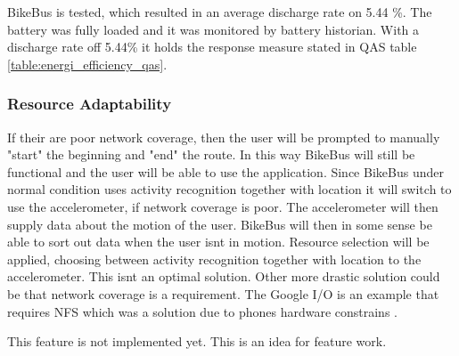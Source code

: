 BikeBus is tested, which resulted in an average discharge rate on 5.44 \%. The battery was fully loaded and it was monitored by battery historian. With a discharge rate off 5.44\% it holds the response measure stated in QAS table \ref{table:energi_efficiency_qas}. 





\subsubsection{Resource Adaptability}
If their are poor network coverage, then the user will be prompted to manually "start" the beginning and "end" the route. In this way BikeBus will still be functional and the user will be able to use the application. Since BikeBus under normal condition uses activity recognition together with location it will switch to use the accelerometer, if network coverage is poor. The accelerometer will then supply data about the motion of the user. BikeBus will then in some sense be able to sort out data when the user isnt in motion. Resource selection  \cite{Kjaergaard:2015:AQT:2737182.2737196} will be applied, choosing between activity recognition together with location to the accelerometer. This isnt an optimal solution. Other more drastic solution could be that network coverage is a requirement. The Google I/O is an example that requires NFS which was a solution due to phones hardware constrains \cite{Barnett2015}.     

This feature is not implemented yet. This is an idea for feature work.


